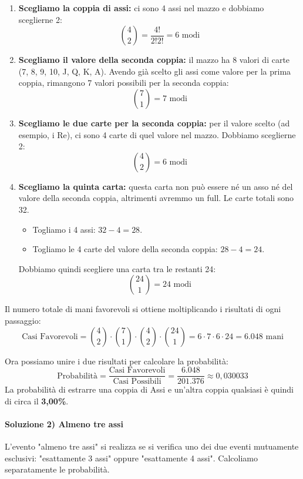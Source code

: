 \begin{esempio}
\begin{enumerate}
    \item \textbf{Scegliamo la coppia di assi:} ci sono 4 assi nel mazzo e dobbiamo sceglierne 2:
    \[ \binom{4}{2} = \frac{4!}{2!2!} = 6 \text{ modi} \]
    
    \item \textbf{Scegliamo il valore della seconda coppia:} il mazzo ha 8 valori di carte (7, 8, 9, 10, J, Q, K, A). Avendo già scelto gli assi come valore per la prima coppia, rimangono 7 valori possibili per la seconda coppia:
    \[ \binom{7}{1} = 7 \text{ modi} \]
    
    \item \textbf{Scegliamo le due carte per la seconda coppia:} per il valore scelto (ad esempio, i Re), ci sono 4 carte di quel valore nel mazzo. Dobbiamo sceglierne 2:
    \[ \binom{4}{2} = 6 \text{ modi} \]
    
    \item \textbf{Scegliamo la quinta carta:} questa carta non può essere né un asso né del valore della seconda coppia, altrimenti avremmo un full. Le carte totali sono 32.
    \begin{itemize}
        \item Togliamo i 4 assi: $32 - 4 = 28$.
        \item Togliamo le 4 carte del valore della seconda coppia: $28 - 4 = 24$.
    \end{itemize}
    Dobbiamo quindi scegliere una carta tra le restanti 24:
    \[ \binom{24}{1} = 24 \text{ modi} \]
\end{enumerate}

Il numero totale di mani favorevoli si ottiene moltiplicando i risultati di ogni passaggio:
\[
\text{Casi Favorevoli} = \binom{4}{2} \cdot \binom{7}{1} \cdot \binom{4}{2} \cdot \binom{24}{1} = 6 \cdot 7 \cdot 6 \cdot 24 = \mathbf{6.048} \text{ mani}
\]

Ora possiamo unire i due risultati per calcolare la probabilità:
\[
\text{Probabilità} = \frac{\text{Casi Favorevoli}}{\text{Casi Possibili}} = \frac{6.048}{201.376} \approx 0,030033
\]
La probabilità di estrarre una coppia di Assi e un'altra coppia qualsiasi è quindi di circa il \textbf{3,00\%}.


\paragraph{Soluzione 2) Almeno tre assi}
L'evento "almeno tre assi" si realizza se si verifica uno dei due eventi mutuamente esclusivi: "esattamente 3 assi" oppure "esattamente 4 assi". Calcoliamo separatamente le probabilità.


\end{esempio}
